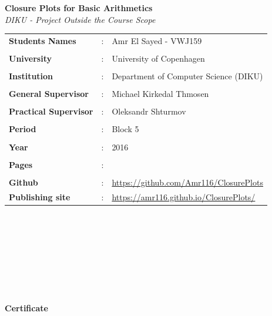 \documentclass[11pt]{article}
\begin{document}
\clearpage\maketitle
\thispagestyle{empty}
\newpage
\begin{center}{\huge\textbf{Closure Plots for Basic Arithmetics}}\newline \textit{\\DIKU - Project Outside the Course Scope}\end{center}
\hfill \break
\begin{tabular}{l l l }
\textbf{Students Names} &: &Amr El Sayed - VWJ159\\\\
\textbf{University} &:& University of Copenhagen\\\\
\textbf{Institution} &:& Department of Computer Science (DIKU)\\\\
\textbf{General Supervisor} &:& Michael Kirkedal Thmosen\\\\
\textbf{Practical Supervisor} &:& Oleksandr Shturmov\\\\
\textbf{Period} &:& Block 5\\\\
\textbf{Year} &:& 2016\\\\
\textbf{Pages} &:& \\\\
\textbf{Github} &:& \url{https://github.com/Amr116/ClosurePlots}\\
\textbf{Publishing site} &:& \url{https://amr116.github.io/ClosurePlots/}
\end{tabular}
\\\\\\\\\\\\\\
\begin{center}{\huge\textbf{Certificate}}\end{center}
\end{document}
